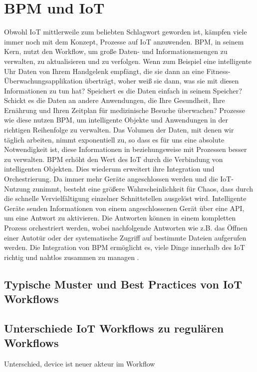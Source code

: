 \documentclass[a4paper, 12pt, twoside, headsepline=true]{scrartcl} %
\begin{document}
\section{BPM und IoT}		
Obwohl IoT mittlerweile zum beliebten Schlagwort geworden ist, kämpfen viele immer noch mit dem Konzept, Prozesse auf IoT anzuwenden. BPM, in seinem Kern, nutzt den Workflow, um große Daten- und Informationsmengen zu verwalten, zu aktualisieren und zu verfolgen. Wenn zum Beispiel eine intelligente Uhr Daten von Ihrem Handgelenk empfängt, die sie dann an eine Fitness-Überwachungsapplikation überträgt, woher weiß sie dann, was sie mit diesen Informationen zu tun hat? Speichert es die Daten einfach in seinem Speicher? Schickt es die Daten an andere Anwendungen, die Ihre Gesundheit, Ihre Ernährung und Ihren Zeitplan für medizinische Besuche überwachen? Prozesse wie diese nutzen BPM, um intelligente Objekte und Anwendungen in der richtigen Reihenfolge zu verwalten. Das Volumen der Daten, mit denen wir täglich arbeiten, nimmt exponentiell zu, so dass es für uns eine absolute Notwendigkeit ist, diese Informationen in beziehungsweise mit Prozessen besser zu verwalten. BPM erhöht den Wert des IoT durch die Verbindung von intelligenten Objekten. Dies wiederum erweitert ihre Integration und Orchestrierung. Da immer mehr Geräte angeschlossen werden und die IoT-Nutzung zunimmt, besteht eine größere Wahrscheinlichkeit für Chaos, dass durch die schnelle Vervielfältigung einzelner Schnittstellen ausgelöst wird. Intelligente Geräte senden Informationen von einem angeschlossenen Gerät über eine API, um eine Antwort zu aktivieren. Die Antworten können in einem kompletten Prozess orchestriert werden, wobei nachfolgende Antworten wie z.B. das Öffnen einer Autotür oder der systematische Zugriff auf bestimmte Dateien aufgerufen werden. Die Integration von BPM ermöglicht es, viele Dinge innerhalb des IoT richtig und nahtlos zusammen zu managen \cite{bpmofthings} .


\subsection{Typische Muster und Best Practices von IoT Workflows}

\subsection{Unterschiede IoT Workflows zu regulären Workflows}

Unterschied, device ist neuer akteur im Workflow
\end{document}
